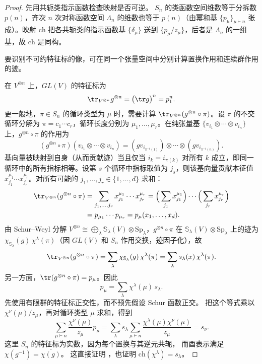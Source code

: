\begin{proof}
先用共轭类指示函数检查映射是否可逆。
$S_n$ 的类函数空间维数等于分拆数 $p(n)$，齐次 $n$ 次对称函数空间 $\Lambda_n$ 的维数也等于 $p(n)$（由幂和基 $\{p_\mu\}_{\mu\vdash n}$ 张成）。映射 $\mathrm{ch}$ 把各共轭类的指示函数基 $\{\delta_\mu\}$ 送到 $\{p_\mu/z_\mu\}$，后者是 $\Lambda_n$ 的一组基，故 $\mathrm{ch}$ 是同构。

要识别不可约特征标的像，可在同一个张量空间中分别计算置换作用和连续群作用的迹。

在 $V^{\otimes n}$ 上，$GL(V)$ 的特征标为
\[
\tr_{V^{\otimes n}} g^{\otimes n}=\bigl(\tr g\bigr)^n=p_1^n.
\]
更一般地，$\pi\in S_n$ 的循环类型为 $\mu$ 时，需要计算 $\tr_{V^{\otimes n}}(g^{\otimes n}\circ\pi)$。设 $\pi$ 的不交循环分解为 $\pi=c_1\cdots c_r$，循环长度分别为 $\mu_1,\dots,\mu_r$。在纯张量基 $\{v_{i_1}\otimes\cdots\otimes v_{i_n}\}$ 上，$g^{\otimes n}\circ\pi$ 的作用为
\[
(g^{\otimes n}\circ\pi)(v_{i_1}\otimes\cdots\otimes v_{i_n})
=(gv_{i_{\pi^{-1}(1)}})\otimes\cdots\otimes(gv_{i_{\pi^{-1}(n)}}).
\]
基向量被映射到自身（从而贡献迹）当且仅当 $i_k=i_{\pi(k)}$ 对所有 $k$ 成立，即同一循环中的所有指标相等。设第 $s$ 个循环中指标取值为 $j_s$，则该基向量贡献本征值 $x_{j_1}^{\mu_1}\cdots x_{j_r}^{\mu_r}$。对所有可能的 $j_1,\dots,j_r\in\{1,\dots,d\}$ 求和：
\begin{align*}
\tr_{V^{\otimes n}}(g^{\otimes n}\circ\pi)
&=\sum_{j_1,\dots,j_r}x_{j_1}^{\mu_1}\cdots x_{j_r}^{\mu_r}
=\Big(\sum_{j_1}x_{j_1}^{\mu_1}\Big)\cdots\Big(\sum_{j_r}x_{j_r}^{\mu_r}\Big) \\
&=p_{\mu_1}\cdots p_{\mu_r}=p_\mu(x_1,\dots,x_d).
\end{align*}
由 Schur--Weyl 分解 $V^{\otimes n}\cong\bigoplus_\lambda\mathbb{S}_\lambda(V)\otimes\mathrm{Sp}_\lambda$，$g^{\otimes n}\circ\pi$ 在 $\mathbb{S}_\lambda(V)\otimes\mathrm{Sp}_\lambda$ 上的迹为 $\chi_{\mathbb{S}_\lambda}(g)\,\chi^\lambda(\pi)$（因 $GL(V)$ 和 $S_n$ 作用交换，迹因子化），故
\[
\tr_{V^{\otimes n}}(g^{\otimes n}\circ\pi)=\sum_\lambda\chi_{\mathbb{S}_\lambda}(g)\,\chi^\lambda(\pi)=\sum_\lambda s_\lambda(x)\,\chi^\lambda(\pi).
\]
另一方面，$\tr(g^{\otimes n}\circ\pi)=p_\mu$。因此
\[
p_\mu=\sum_\lambda\chi^\lambda(\mu)\,s_\lambda.
\]
先使用有限群的特征标正交性，而不预先假设 Schur 函数正交。
把这个等式乘以 $\chi^\nu(\mu)/z_\mu$，再对循环类型 $\mu$ 求和，得到
\[
\sum_{\mu\vdash n}\frac{\chi^\nu(\mu)}{z_\mu}p_\mu
=\sum_\lambda s_\lambda
\sum_{\mu\vdash n}\frac{\chi^\lambda(\mu)\chi^\nu(\mu)}{z_\mu}
=s_\nu.
\]
这里 $S_n$ 的特征标为实数，因为每个置换与其逆元共轭，
而酉表示满足 $\chi(g^{-1})=\overline{\chi(g)}$。
这直接证明 ，也证明
$\mathrm{ch}(\chi^\lambda)=s_\lambda$。


\end{proof}
